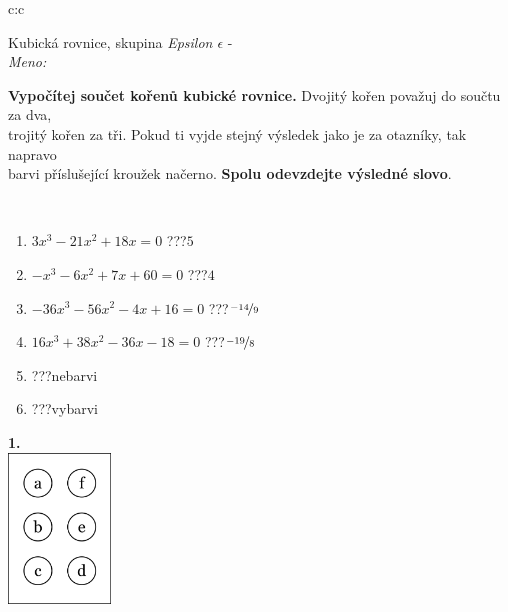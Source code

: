\documentclass[10pt]{report}
\begin{document}
\begin{tabular}{c:c}
\begin{minipage}[c][104.5mm][t]{0.5\linewidth}
\begin{center}
\vspace{7mm}
{\huge Kubická rovnice, skupina \textit{Epsilon $\epsilon$} -}\\[5mm]
\textit{Meno:}\phantom{xxxxxxxxxxxxxxxxxxxxxxxxxxxxxxxxxxxxxxxxxxxxxxxxxxxxxxxxxxxxxxxxx}\\[5mm]
\begin{minipage}{0.95\linewidth}
\textbf{Vypočítej součet kořenů kubické rovnice.} Dvojitý kořen považuj do součtu za dva,\\trojitý kořen za tři. Pokud ti vyjde stejný výsledek jako je za otazníky, tak napravo\\barvi příslušející kroužek načerno. \textbf{Spolu odevzdejte výsledné slovo}.
\end{minipage}
\\[1mm]
\begin{minipage}{0.79\linewidth}
\begin{center}
\begin{varwidth}{\linewidth}
\begin{enumerate}
\Large
\item $3x^3-21x^2+18x=0$\quad \dotfill\; ???\;\dotfill \quad $5$
\item $-x^3-6x^2+7x+60=0$\quad \dotfill\; ???\;\dotfill \quad $4$
\item $-36x^3-56x^2-4x+16=0$\quad \dotfill\; ???\;\dotfill \quad $\nicefrac{-14}{9}$
\item $16x^3+38x^2-36x-18=0$\quad \dotfill\; ???\;\dotfill \quad $\nicefrac{-19}{8}$
\item \quad \dotfill\; ???\;\dotfill \quad nebarvi
\item \quad \dotfill\; ???\;\dotfill \quad vybarvi
\end{enumerate}
\end{varwidth}
\end{center}
\end{minipage}
\begin{minipage}{0.20\linewidth}
\begin{center}
{\Huge\bfseries 1.} \\[2mm]
\includegraphics[height=40mm]{../images/braille.png}

\end{center}
\end{minipage}
\end{center}
\end{minipage}
\end{tabular}
\end{document}
